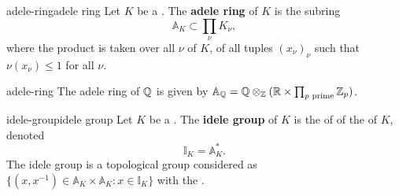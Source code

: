 \begin{topic}{adele-ring}{adele ring}
    Let $K$ be a . The \textbf{adele ring} of $K$ is the subring
    \[ \mathbb{A}_K \subset \prod_{\nu} K_\nu , \]
    where the product is taken over all  $\nu$ of $K$, of all tuples $(x_\nu)_\nu$ such that $\nu(x_\nu) \le 1$ for all  $\nu$.
\end{topic}

\begin{example}{adele-ring}
    The adele ring of $\mathbb{Q}$ is given by $\mathbb{A}_{\mathbb{Q}} = \mathbb{Q} \otimes_{\mathbb{Z}} (\mathbb{R} \times \prod_{p \textup{ prime}} \mathbb{Z}_p)$.
\end{example}

\begin{topic}{idele-group}{idele group}
    Let $K$ be a . The \textbf{idele group} of $K$ is the  of  of the  of $K$, denoted
    \[ \mathbb{I}_K = \mathbb{A}_K^* . \]
    The idele group is a topological group considered as $\{ (x, x^{-1}) \in \mathbb{A}_K \times \mathbb{A}_K : x \in \mathbb{I}_K \}$ with the .
\end{topic}
